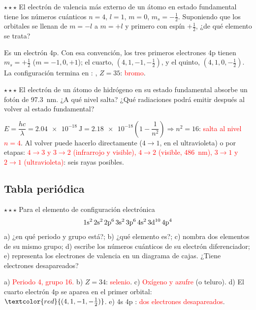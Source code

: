 \begin{exercise}
    \(\star\star\star\) El electrón de valencia más externo de un átomo en estado fundamental tiene los números cuánticos
    \(n = 4\), \(l = 1\), \(m = 0\), \(m_s = -\frac{1}{2}\). Suponiendo que los orbitales se llenan de \(m = -l\) a \(m = +l\) y
    primero con espín \(+\frac{1}{2}\), ¿de qué elemento se trata?
    \begin{solu}
        Es un electrón 4p. Con esa convención, los tres primeros electrones 4p tienen \(m_s = +\frac{1}{2}\) (\(m = -1, 0, +1\)); el
        cuarto, \((4, 1, -1, -\frac{1}{2})\), y el quinto, \((4, 1, 0, -\frac{1}{2})\). La configuración termina en :
        , \(Z = 35\): \textcolor{red}{bromo}.
    \end{solu}
\end{exercise}

\begin{exercise}
    \(\star\star\star\) El electrón de un átomo de hidrógeno en su estado fundamental absorbe un fotón de \qty{97.3}{\nm}. ¿A qué
    nivel salta? ¿Qué radiaciones podrá emitir después al volver al estado fundamental?
    \begin{solu}
        \(E = \dfrac{hc}{\lambda} = \qty{2.04e-18}{\joule} = \num{2.18e-18} \left( 1 - \dfrac{1}{n^2} \right) \Rightarrow
        n^2 = 16\): \textcolor{red}{salta al nivel \(n = 4\)}. Al volver puede hacerlo directamente (\(4 \rightarrow 1\), en el
        ultravioleta) o por etapas: \textcolor{red}{\(4 \rightarrow 3\) y \(3 \rightarrow 2\) (infrarrojo y visible),
        \(4 \rightarrow 2\) (visible, \qty{486}{\nm}), \(3 \rightarrow 1\) y \(2 \rightarrow 1\) (ultravioleta)}: seis rayas
        posibles.
    \end{solu}
\end{exercise}

\subsection{Tabla periódica}

\begin{exercise}
    \(\star\star\star\) Para el elemento de configuración electrónica
    \[ \mathrm{1s^2\,2s^2\,2p^6\,3s^2\,3p^6\,4s^2\,3d^{10}\,4p^4} \]
    a) ¿en qué periodo y grupo está?; b) ¿qué elemento es?; c) nombra dos elementos de su mismo grupo; d) escribe los números
    cuánticos de su electrón diferenciador; e) representa los electrones de valencia en un diagrama de cajas. ¿Tiene electrones
    desapareados?
    \begin{solu}
        a) \textcolor{red}{Periodo 4, grupo 16.} b) \(Z = 34\): \textcolor{red}{selenio}. c) \textcolor{red}{Oxígeno y azufre}
        (o teluro). d) El cuarto electrón 4p se aparea en el primer orbital: \(\textcolor{red}{(4, 1, -1, -\frac{1}{2})}\).
        e) 4s \orbcaja{\uparrow\downarrow} 4p \orbcaja{\uparrow\downarrow}\orbcaja{\uparrow}\orbcaja{\uparrow}:
        \textcolor{red}{dos electrones desapareados}.
    \end{solu}
\end{exercise}

